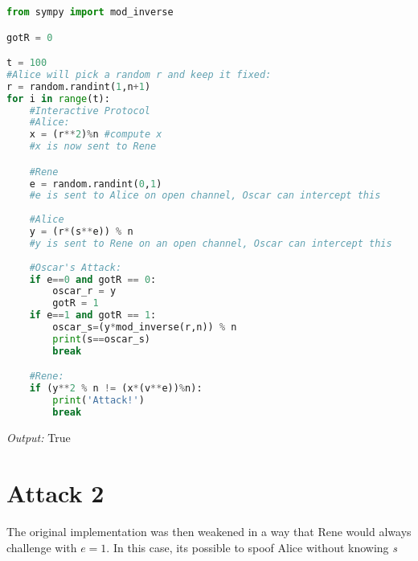 \begin{lstlisting}[language=Python]
from sympy import mod_inverse

gotR = 0

t = 100
#Alice will pick a random r and keep it fixed:
r = random.randint(1,n+1)
for i in range(t):
	#Interactive Protocol
	#Alice:
	x = (r**2)%n #compute x
	#x is now sent to Rene

	#Rene
	e = random.randint(0,1)
	#e is sent to Alice on open channel, Oscar can intercept this
	
	#Alice
	y = (r*(s**e)) % n
	#y is sent to Rene on an open channel, Oscar can intercept this
	
	#Oscar's Attack:
	if e==0 and gotR == 0:
		oscar_r = y
		gotR = 1
	if e==1 and gotR == 1:
		oscar_s=(y*mod_inverse(r,n)) % n
		print(s==oscar_s)
		break

	#Rene:
	if (y**2 % n != (x*(v**e))%n):
		print('Attack!')
		break
\end{lstlisting}
\textit{Output:} True

\section{Attack 2}
\paragraph{ }The original implementation was then weakened in a way that Rene would always challenge with $e=1$. In this case, its possible to spoof Alice without knowing \textit{s}